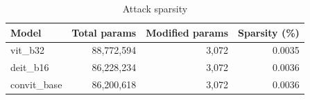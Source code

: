 \begin{table}[htbp]
\centering
\begin{tabular}{lrrr}
\toprule
Model & Total params & Modified params & Sparsity (\%) \\
\midrule
vit\_b32 & 88,772,594 & 3,072 & 0.0035 \\
deit\_b16 & 86,228,234 & 3,072 & 0.0036 \\
convit\_base & 86,200,618 & 3,072 & 0.0036 \\
\bottomrule
\end{tabular}
\caption{Attack sparsity}
\label{tab:table9}
\end{table}
